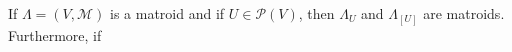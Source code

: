 If $\Lambda = (V, \mathcal{M})$ is a matroid and if $U \in \mathcal{P}(V)$, then $\Lambda_U$ and $\Lambda_{[U]}$ are matroids. Furthermore, if
